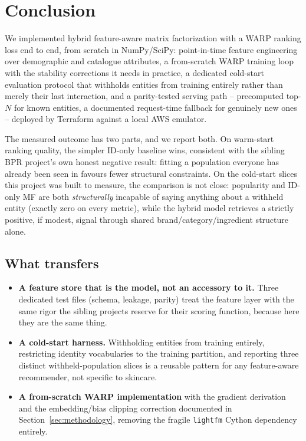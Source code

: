 \section{Conclusion}
\label{sec:conclusion}

We implemented hybrid feature-aware matrix factorization with a WARP ranking
loss end to end, from scratch in NumPy/SciPy: point-in-time feature
engineering over demographic and catalogue attributes, a from-scratch WARP
training loop with the stability corrections it needs in practice, a
dedicated cold-start evaluation protocol that withholds entities from
training entirely rather than merely their last interaction, and a
parity-tested serving path -- precomputed top-$N$ for known entities, a
documented request-time fallback for genuinely new ones -- deployed by
Terraform against a local AWS emulator.

The measured outcome has two parts, and we report both. On warm-start
ranking quality, the simpler ID-only baseline wins, consistent with the
sibling BPR project's own honest negative result: fitting a population
everyone has already been seen in favours fewer structural constraints. On
the cold-start slices this project was built to measure, the comparison is
not close: popularity and ID-only MF are both \emph{structurally} incapable
of saying anything about a withheld entity (exactly zero on every metric),
while the hybrid model retrieves a strictly positive, if modest, signal
through shared brand/category/ingredient structure alone.

\subsection{What transfers}

\begin{itemize}
  \item \textbf{A feature store that is the model, not an accessory to it.}
        Three dedicated test files (schema, leakage, parity) treat the
        feature layer with the same rigor the sibling projects reserve for
        their scoring function, because here they are the same thing.
  \item \textbf{A cold-start harness.} Withholding entities from training
        entirely, restricting identity vocabularies to the training
        partition, and reporting three distinct withheld-population slices
        is a reusable pattern for any feature-aware recommender, not
        specific to skincare.
  \item \textbf{A from-scratch WARP implementation} with the gradient
        derivation and the embedding/bias clipping correction documented in
        Section~\ref{sec:methodology}, removing the fragile \texttt{lightfm}
        Cython dependency entirely.
\end{itemize}

